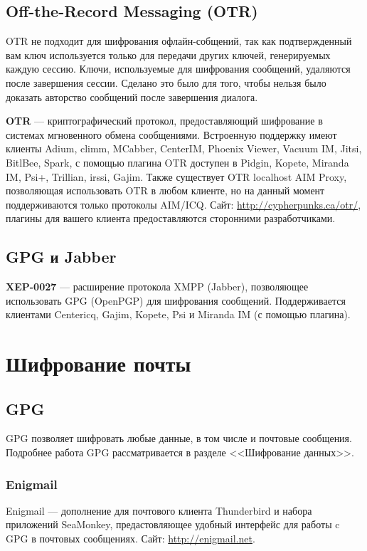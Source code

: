 \subsection{Off-the-Record Messaging (OTR)}
\begin{important}
OTR не подходит для шифрования офлайн-собщений, так как подтвержденный вам ключ используется только для передачи других ключей, генерируемых каждую сессию. Ключи, используемые для шифрования сообщений, удаляются после завершения сессии. Сделано это было для того, чтобы нельзя было доказать авторство сообщений после завершения диалога.
\end{important}
\textbf{OTR} --- криптографический протокол, предоставляющий шифрование в системах мгновенного обмена сообщениями. Встроенную поддержку имеют клиенты Adium, climm, MCabber, CenterIM, Phoenix Viewer, Vacuum IM, Jitsi, BitlBee, Spark, с помощью плагина OTR доступен в Pidgin\cite{otr-pidgin}, Kopete\cite{otr-kopete}, Miranda IM\cite{otr-miranda}, Psi+\cite{otr-psi}, Trillian\cite{otr-trillian}, irssi\cite{otr-irssi}, Gajim\cite{otr-gajim}. Также существует OTR localhost AIM Proxy, позволяющая использовать OTR в любом клиенте, но на данный момент поддерживаются только протоколы AIM/ICQ. Сайт: \url{http://cypherpunks.ca/otr/}, плагины для вашего клиента предоставляются сторонними разработчиками.
\subsection{GPG и Jabber}
\textbf{XEP-0027} --- расширение протокола XMPP (Jabber), позволяющее использовать GPG (OpenPGP) для шифрования сообщений\cite{xep-0027}. Поддерживается клиентами Centericq, Gajim, Kopete, Psi и Miranda IM (с помощью плагина).

\section{Шифрование почты}
\subsection{GPG}
GPG позволяет шифровать любые данные, в том числе и почтовые сообщения. Подробнее работа GPG рассматривается в разделе <<Шифрование данных>>.
\subsubsection{Enigmail}
Enigmail --- дополнение для почтового клиента Thunderbird и набора приложений SeaMonkey, предастовляющее удобный интерфейс для работы c GPG в почтовых сообщениях. Сайт: \url{http://enigmail.net}.

